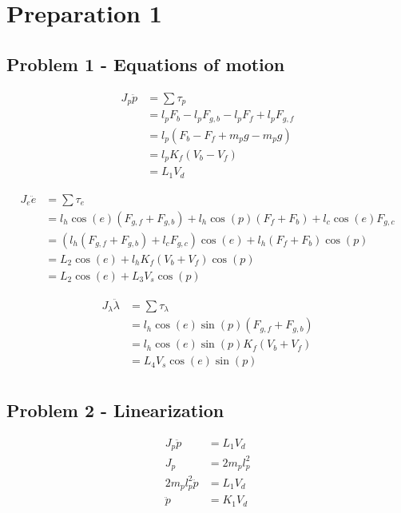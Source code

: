 \section{Preparation 1}
\subsection{Problem 1 - Equations of motion}
\begin{align*}
    J_p \ddot{p} &= \sum \tau_p \\
                 &= l_p F_b - l_p F_{g,b} - l_p F_f + l_p F_{g,f} \\
                 &= l_p (F_b - F_f + m_p g - m_p g) \\
                 &= l_p K_f (V_b - V_f) \\
                 &= L_1 V_d
\end{align*}

\begin{align*}
    J_e \ddot{e} &= \sum \tau_e \\
                 &= l_h \cos(e) (F_{g,f} + F_{g,b}) + l_h \cos(p) (F_f + F_b) + l_c \cos(e) F_{g,c} \\
                 &= (l_h (F_{g,f} + F_{g,b}) + l_c F_{g,c}) \cos(e) + l_h (F_f + F_b) \cos(p) \\
                 &= L_2 \cos(e) + l_h K_f (V_b + V_f) \cos(p) \\
                 &= L_2 \cos(e) + L_3 V_s \cos(p)
\end{align*}

\begin{align*}
    J_\lambda \ddot{\lambda} &= \sum \tau_\lambda \\
                 &= l_h \cos(e) \sin(p) (F_{g,f} + F_{g,b})\\
                 &= l_h \cos(e) \sin(p) K_f(V_b + V_f)\\
                 &= L_4 V_s \cos(e) \sin(p)\\
\end{align*}
\subsection{Problem 2 - Linearization}

\begin{align*}
    J_p \ddot{p} &= L_1 V_d \\
    J_p &=2 m_p l_p^2 \\
    2 m_p l_p^2 \ddot{p} &=L_1 V_d \\
    \ddot{p} &=K_1 V_d \\
\end{align*}

